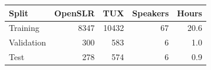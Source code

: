 \begin{tabular}{lrrrr}
\toprule
Split & OpenSLR & TUX & Speakers & Hours \\
\midrule
Training & 8347 & 10432 & 67 & 20.6 \\
Validation & 300 & 583 & 6 & 1.0 \\
Test & 278 & 574 & 6 & 0.9 \\
\bottomrule
\end{tabular}

